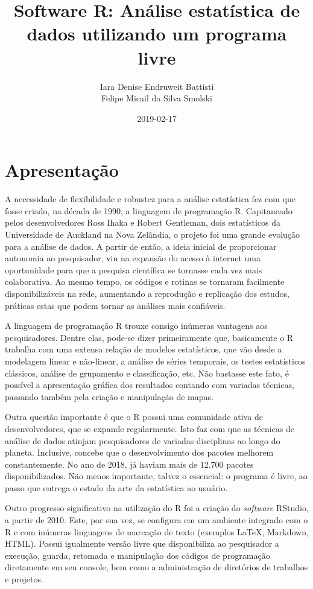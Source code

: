\documentclass[12pt,brazil,oneside]{book}
\title{Software R: Análise estatística de dados utilizando um programa livre}
\author{Iara Denise Endruweit Battisti \\ Felipe Micail da Silva Smolski}
\date{2019-02-17}
\begin{document}
\maketitle

{
\setcounter{tocdepth}{1}
\tableofcontents
}
\hypertarget{apresentacao}{%
\chapter*{Apresentação}\label{apresentacao}}

A necessidade de flexibilidade e robustez para a análise estatística fez com que fosse criado, na década de 1990, a linguagem de programação R. Capitaneado pelos desenvolvedores Ross Ihaka e Robert Gentleman, dois estatísticos da Universidade de Auckland na Nova Zelândia, o projeto foi uma grande evolução para a análise de dados. A partir de então, a ideia inicial de proporcionar autonomia ao pesquisador, viu na expansão do acesso à internet uma oportunidade para que a pesquisa científica se tornasse cada vez mais colaborativa. Ao mesmo tempo, os códigos e rotinas se tornaram facilmente disponibilizáveis na rede, aumentando a reprodução e replicação dos estudos, práticas estas que podem tornar as análises mais confiáveis.

A linguagem de programação R trouxe consigo inúmeras vantagens aos pesquisadores. Dentre elas, pode-se dizer primeiramente que, basicamente o R trabalha com uma extensa relação de modelos estatísticos, que vão desde a modelagem linear e não-linear, a análise de séries temporais, os testes estatísticos clássicos, análise de grupamento e classificação, etc. Não bastasse este fato, é possível a apresentação gráfica dos resultados contando com variadas técnicas, passando também pela criação e manipulação de mapas.

Outra questão importante é que o R possui uma comunidade ativa de desenvolvedores, que se expande regularmente. Isto faz com que as técnicas de análise de dados atinjam pesquisadores de variadas disciplinas ao longo do planeta. Inclusive, concebe que o desenvolvimento dos pacotes melhorem constantemente. No ano de 2018, já haviam mais de 12.700 pacotes disponibilizados. Não menos importante, talvez o essencial: o programa é livre, ao passo que entrega o estado da arte da estatística ao usuário.

Outro progresso significativo na utilização do R foi a criação do \emph{software} RStudio, a partir de 2010. Este, por sua vez, se configura em um ambiente integrado com o R e com inúmeras linguagens de marcação de texto (exemplos LaTeX, Markdown, HTML). Possui igualmente versão livre que disponibiliza ao pesquisador a execução, guarda, retomada e manipulação dos códigos de programação diretamente em seu console, bem como a administração de diretórios de trabalhos e projetos.
\end{document}

